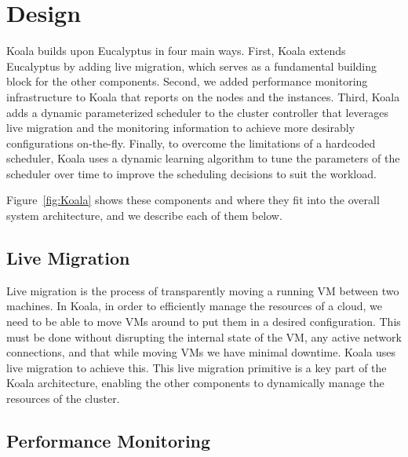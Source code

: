\section{Design}




Koala builds upon Eucalyptus in four main ways.  First, Koala extends
Eucalyptus by adding live migration, which serves as a fundamental building
block for the other components.  Second, we added performance monitoring
infrastructure to Koala that reports on the nodes and the instances. Third,
Koala adds a dynamic parameterized scheduler to the cluster controller that
leverages live migration and the monitoring information to achieve more
desirably configurations on-the-fly.  Finally, to overcome the limitations of a
hardcoded scheduler, Koala uses a dynamic learning algorithm to tune the
parameters of the scheduler over time to improve the scheduling decisions to
suit the workload.

Figure~\ref{fig:Koala} shows these components and where they fit into the
overall system architecture, and we describe each of them below.


\subsection{Live Migration}
Live migration is the process of transparently moving a running VM between two
machines.  In Koala, in order to efficiently manage the resources of a cloud,
we need to be able to move VMs around to put them in a desired configuration.
This must be done without disrupting the internal state of the VM, any active
network connections, and that while moving VMs we have minimal downtime.  Koala
uses live migration to achieve this.  This live migration primitive is a key
part of the Koala architecture, enabling the other components to dynamically
manage the resources of the cluster.

\subsection{Performance Monitoring}

